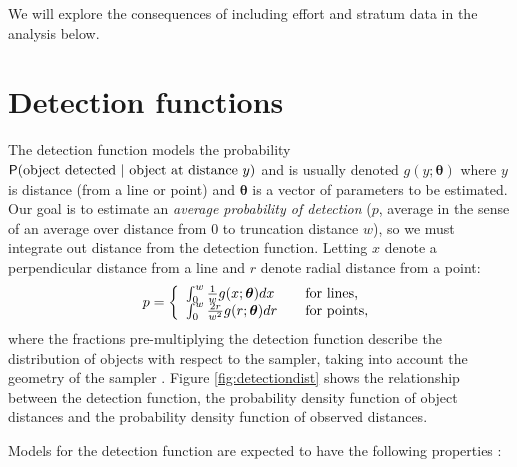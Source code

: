 \documentclass[article]{jss}\usepackage[]{graphicx}\usepackage[]{color}
\begin{document}
We will explore the consequences of including effort and stratum data in the analysis below.

\section{Detection functions}

The detection function models the probability $\mathsf{P}(\text{object detected } \vert \text{ object at distance } y)$ and is usually denoted $g(y; \boldsymbol{\theta})$ where $y$ is distance (from a line or point) and $\boldsymbol{\theta}$ is a vector of parameters to be estimated. Our goal is to estimate an \textit{average probability of detection} ($p$, average in the sense of an average over distance from $0$ to truncation distance $w$), so we must integrate out distance from the detection function. Letting $x$ denote a perpendicular distance from a line and $r$ denote radial distance from a point:
$$
p = \left\{
\begin{array}{l l}
\int_0^w \frac{1}{w}    g(x; \boldsymbol{\theta}) dx & \quad \text{for lines,} \\
\int_0^w \frac{2r}{w^2} g(r; \boldsymbol{\theta}) dr & \quad \text{for points,}
\end{array} \right.
$$
where the fractions pre-multiplying the detection function describe the distribution of objects with respect to the sampler, taking into account the geometry of the sampler \citep[usually referred to as the \textit{probability density function of (object) distances} and denoted $\pi(y)$;][Chapter 3]{Buckland:2001vm}. Figure \ref{fig:detectiondist} shows the relationship between the detection function, the probability density function of object distances and the probability density function of observed distances.


Models for the detection function are expected to have the following properties \citep[][Chapter 5]{buckland2015distance}:
\end{document}
